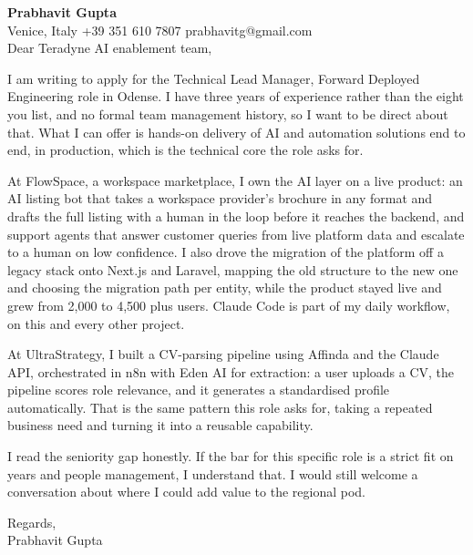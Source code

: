 \documentclass[a4paper,10.5pt]{article}
\begin{document}
\textbf{Prabhavit Gupta}\\
Venice, Italy \textbar{} +39 351 610 7807 \textbar{} prabhavitg@gmail.com\\[10pt]
Dear Teradyne AI enablement team,

I am writing to apply for the Technical Lead Manager, Forward Deployed Engineering role in Odense. I have three years of experience rather than the eight you list, and no formal team management history, so I want to be direct about that. What I can offer is hands-on delivery of AI and automation solutions end to end, in production, which is the technical core the role asks for.

At FlowSpace, a workspace marketplace, I own the AI layer on a live product: an AI listing bot that takes a workspace provider's brochure in any format and drafts the full listing with a human in the loop before it reaches the backend, and support agents that answer customer queries from live platform data and escalate to a human on low confidence. I also drove the migration of the platform off a legacy stack onto Next.js and Laravel, mapping the old structure to the new one and choosing the migration path per entity, while the product stayed live and grew from 2,000 to 4,500 plus users. Claude Code is part of my daily workflow, on this and every other project.

At UltraStrategy, I built a CV-parsing pipeline using Affinda and the Claude API, orchestrated in n8n with Eden AI for extraction: a user uploads a CV, the pipeline scores role relevance, and it generates a standardised profile automatically. That is the same pattern this role asks for, taking a repeated business need and turning it into a reusable capability.

I read the seniority gap honestly. If the bar for this specific role is a strict fit on years and people management, I understand that. I would still welcome a conversation about where I could add value to the regional pod.

Regards,\\
Prabhavit Gupta
\end{document}
